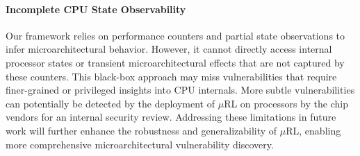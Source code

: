 \paragraph{Incomplete CPU State Observability}
Our framework relies on performance counters and partial state observations to infer microarchitectural behavior. However, it cannot directly access internal processor states or transient microarchitectural effects that are not captured by these counters. This black-box approach may miss vulnerabilities that require finer-grained or privileged insights into CPU internals. More subtle vulnerabilities can potentially be detected by the deployment of $\mu$RL on processors by the chip vendors for an internal security review.
%
%
%
%
%
%
Addressing these limitations in future work will further enhance the robustness and generalizability of $\mu$RL, enabling more comprehensive microarchitectural vulnerability discovery.

